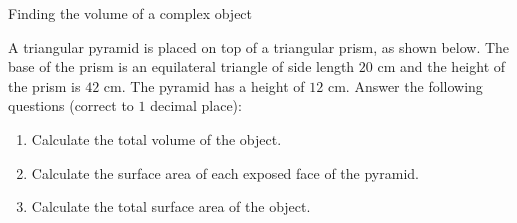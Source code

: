 \begin{wex}{Finding the volume of a complex object}
 {A triangular pyramid is placed on top of a triangular prism, as shown below. 
The base of the prism is an equilateral triangle of side length $20$ cm and the height of the prism is $42$ cm. The pyramid has a height of $12$ cm. Answer the following questions (correct to $1$ decimal place):

\begin{enumerate}[noitemsep, label=\textbf{\arabic*}. ] 
\item Calculate the total volume of the object.
\item Calculate the surface area of each exposed face of the pyramid.
\item Calculate the total surface area of the object.
\end{enumerate}

\begin{center}


\end{center}}
\end{wex}
